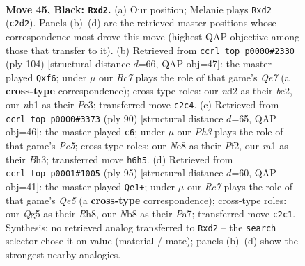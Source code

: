 \documentclass[11pt]{article}
\begin{document}
\clearpage

\begin{figure}[p]\centering
\begin{subfigure}{0.46\textwidth}\centering
\resizebox{\linewidth}{!}{%
\newchessgame
\chessboard[
  setfen={1n2nk2/7Q/7p/p4pq1/P7/7K/2rN4/RN6 b - - 3 45},
  showmover=false,
  pgfstyle=straightmove, color=movearrow, markmove={c2-d2}
]}
\caption{}
\end{subfigure}\hfill
\begin{subfigure}{0.46\textwidth}\centering
\resizebox{\linewidth}{!}{%
\newchessgame
\chessboard[
  setfen={6k1/4Q3/p4np1/8/3N4/P1P1P3/1q2b1K1/8 w - - 0 53},
  showmover=false,
  pgfstyle=straightmove, color=movearrow, markmove={e7-f6}
]}
\caption{}
\end{subfigure}
\\[4pt]
\begin{subfigure}{0.46\textwidth}\centering
\resizebox{\linewidth}{!}{%
\newchessgame
\chessboard[
  setfen={4q3/rnr4k/1R4pp/2P1P3/4Q3/7B/4NP2/6K1 w - - 2 46},
  showmover=false,
  pgfstyle=straightmove, color=movearrow, markmove={c5-c6}
]}
\caption{}
\end{subfigure}\hfill
\begin{subfigure}{0.46\textwidth}\centering
\resizebox{\linewidth}{!}{%
\newchessgame
\chessboard[
  setfen={7r/pp4k1/6p1/3pN1Q1/4q3/P5K1/1P4R1/8 b - - 15 48},
  showmover=false,
  pgfstyle=straightmove, color=movearrow, markmove={e4-e1}
]}
\caption{}
\end{subfigure}
\caption{\textbf{Move 45, Black: \texttt{Rxd2}.} (a) Our position; Melanie plays \texttt{Rxd2} (\texttt{c2d2}). Panels (b)--(d) are the retrieved master positions whose correspondence most drove this move (highest QAP objective among those that transfer to it). (b) Retrieved from \texttt{ccrl\_top\_p0000\#2330} (ply 104) [structural distance $d$=66, QAP obj=47]: the master played \texttt{Qxf6}; under $\mu$ our \emph{Rc7} plays the role of that game's \emph{Qe7} (a \textbf{cross-type} correspondence); cross-type roles: our \emph{n}d2 as their \emph{b}e2, our \emph{n}b1 as their \emph{P}e3; transferred move \texttt{c2c4}. (c) Retrieved from \texttt{ccrl\_top\_p0000\#3373} (ply 90) [structural distance $d$=65, QAP obj=46]: the master played \texttt{c6}; under $\mu$ our \emph{Ph3} plays the role of that game's \emph{Pc5}; cross-type roles: our \emph{N}e8 as their \emph{P}f2, our \emph{r}a1 as their \emph{B}h3; transferred move \texttt{h6h5}. (d) Retrieved from \texttt{ccrl\_top\_p0001\#1005} (ply 95) [structural distance $d$=60, QAP obj=41]: the master played \texttt{Qe1+}; under $\mu$ our \emph{Rc7} plays the role of that game's \emph{Qe5} (a \textbf{cross-type} correspondence); cross-type roles: our \emph{Q}g5 as their \emph{R}h8, our \emph{N}b8 as their \emph{P}a7; transferred move \texttt{c2c1}. Synthesis: no retrieved analog transferred to \texttt{Rxd2} -- the \texttt{search} selector chose it on value (material / mate); panels (b)--(d) show the strongest nearby analogies.}
\label{fig:thought-m89}
\end{figure}
\end{document}
